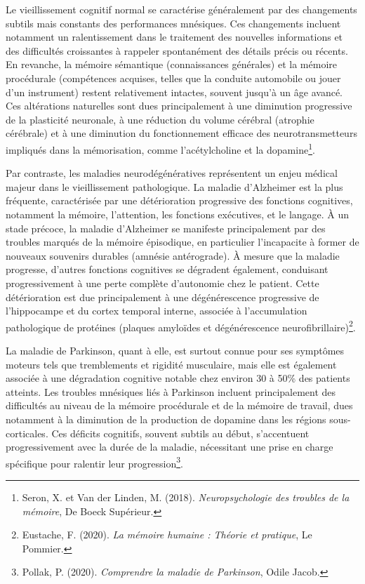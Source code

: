 \documentclass[11pt,a4paper]{report}
\begin{document}
Le vieillissement cognitif normal se caractérise généralement par des changements subtils mais constants des performances mnésiques. Ces changements incluent notamment un ralentissement dans le traitement des nouvelles informations et des difficultés croissantes à rappeler spontanément des détails précis ou récents. En revanche, la mémoire sémantique (connaissances générales) et la mémoire procédurale (compétences acquises, telles que la conduite automobile ou jouer d'un instrument) restent relativement intactes, souvent jusqu'à un âge avancé. Ces altérations naturelles sont dues principalement à une diminution progressive de la plasticité neuronale, à une réduction du volume cérébral (atrophie cérébrale) et à une diminution du fonctionnement efficace des neurotransmetteurs impliqués dans la mémorisation, comme l’acétylcholine et la dopamine\footnote{Seron, X. et Van der Linden, M. (2018). \textit{Neuropsychologie des troubles de la mémoire}, De Boeck Supérieur.}.

Par contraste, les maladies neurodégénératives représentent un enjeu médical majeur dans le vieillissement pathologique. La maladie d'Alzheimer est la plus fréquente, caractérisée par une détérioration progressive des fonctions cognitives, notamment la mémoire, l’attention, les fonctions exécutives, et le langage. À un stade précoce, la maladie d'Alzheimer se manifeste principalement par des troubles marqués de la mémoire épisodique, en particulier l’incapacite à former de nouveaux souvenirs durables (amnésie antérograde). À mesure que la maladie progresse, d'autres fonctions cognitives se dégradent également, conduisant progressivement à une perte complète d’autonomie chez le patient. Cette détérioration est due principalement à une dégénérescence progressive de l’hippocampe et du cortex temporal interne, associée à l’accumulation pathologique de protéines (plaques amyloïdes et dégénérescence neurofibrillaire)\footnote{Eustache, F. (2020). \textit{La mémoire humaine : Théorie et pratique}, Le Pommier.}.

La maladie de Parkinson, quant à elle, est surtout connue pour ses symptômes moteurs tels que tremblements et rigidité musculaire, mais elle est également associée à une dégradation cognitive notable chez environ 30 à 50\% des patients atteints. Les troubles mnésiques liés à Parkinson incluent principalement des difficultés au niveau de la mémoire procédurale et de la mémoire de travail, dues notamment à la diminution de la production de dopamine dans les régions sous-corticales. Ces déficits cognitifs, souvent subtils au début, s’accentuent progressivement avec la durée de la maladie, nécessitant une prise en charge spécifique pour ralentir leur progression\footnote{Pollak, P. (2020). \textit{Comprendre la maladie de Parkinson}, Odile Jacob.}.
\end{document}
